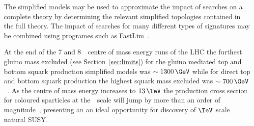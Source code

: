 The simplified models may be used to approximate the impact of searches on a complete theory 
by determining the relevant simplified topologies contained in the full theory. The impact
of searches for many different types of signatures may be combined using programes 
such as FastLim~\cite{Fastlim}.

At the end of the 7 and 8~\TeV~centre of mass energy runs of the LHC the furthest
gluino mass excluded (see Section~\ref{sec:limits}) for the gluino mediated top and bottom 
squark production simplified models was $\sim 1300\,\GeV$ while for direct top and 
bottom squark production the highest squark mass excluded was $\sim 700\,\GeV$~\cite{limits8}. 
As the centre of mass energy increases to $13\,\TeV$ the production cross section for coloured sparticles
at the~\TeV~scale will jump by more than an order of magnitude~\cite{snowmass}, presenting an
an ideal opportunity for discovery of $\TeV$ scale natural SUSY.




